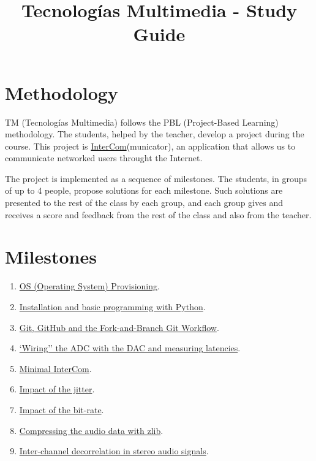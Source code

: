 \title{Tecnologías Multimedia - Study Guide}

\maketitle

\section{Methodology}
TM (Tecnologías Multimedia) follows the PBL (Project-Based Learning) methodology. The students,
helped by the teacher, develop a project during the course. This
project
is \href{https://github.com/Tecnologias-multimedia/intercom}{InterCom}(municator),
an application that allows us to communicate networked users throught
the Internet.

The project is implemented as a sequence of milestones. The students,
in groups of up to 4 people, propose solutions for each
milestone. Such solutions are presented to the rest of the class by
each group, and each group gives and receives a score and feedback
from the rest of the class and also from the teacher.

\section{Milestones}
\begin{enumerate}
\item \href{https://tecnologias-multimedia.github.io/study_guide/provisioning/}{OS (Operating System) Provisioning}.
\item \href{https://tecnologias-multimedia.github.io/study_guide/install/}{Installation and basic programming with Python}.
\item \href{https://tecnologias-multimedia.github.io/study_guide/git/}{Git, GitHub and the Fork-and-Branch Git Workflow}.
\item \href{https://tecnologias-multimedia.github.io/study_guide/wiring/}{`Wiring'' the ADC with the DAC and measuring latencies}.
\item \href{https://tecnologias-multimedia.github.io/study_guide/minimal/}{Minimal InterCom}.
\item \href{https://tecnologias-multimedia.github.io/study_guide/jitter_impact/}{Impact of the jitter}.
\item \href{https://tecnologias-multimedia.github.io/study_guide/bitrate_impact/}{Impact of the bit-rate}.
\item \href{https://tecnologias-multimedia.github.io/study_guide/compress/}{Compressing the audio data with zlib}.
\item \href{https://tecnologias-multimedia.github.io/study_guide/stereo_coding/}{Inter-channel decorrelation in stereo audio signals}.
\end{enumerate}

